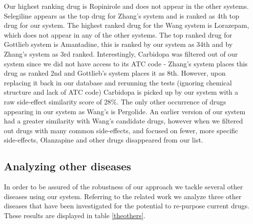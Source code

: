 \documentclass[preprint,11pt]{elsarticle}
\begin{document}
Our highest ranking drug is Ropinirole and does not appear in the other systems. Selegiline appears as the top drug for Zhang's system and is ranked as 4th top drug for our system. The highest ranked drug for the Wang system is Lorazepam, which does not appear in any of the other systems. The top ranked drug for Gottlieb system is Amantadine, this is ranked by our system as 34th and by Zhang's system as 3rd ranked. Interestingly, Carbidopa was filtered out of our system since we did not have access to its ATC code - Zhang's system places this drug as ranked 2nd and Gottlieb's system places it as 8th. However, upon replacing it back in our database and rerunning the tests (ignoring chemical structure and lack of ATC code) Carbidopa is picked up by our system with a raw side-effect similarity score of 28\%. The only other occurrence of drugs appearing in our system as Wang's is Pergolide. An earlier version of our system had a greater similarity with Wang's candidate drugs, however when we filtered out drugs with many common side-effects, and focused on fewer, more specific side-effects, Olanzapine and other drugs disappeared from our list. 

\subsection{Analyzing other diseases}
In order to be assured of the robustness of our approach we tackle several other diseases using our system. Referring to the related work we analyze three other diseases that have been investigated for the potential to re-purpose current drugs. These results are displayed in table \ref{theothers}.
\end{document}

